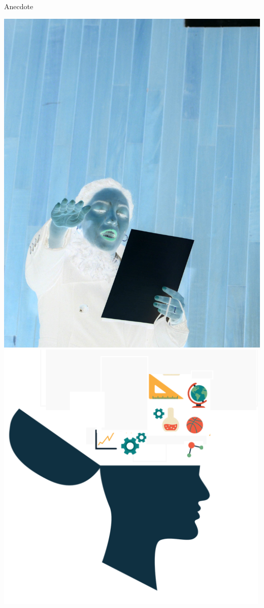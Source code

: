\documentclass{beamer}
\begin{document}
\begin{frame}
 {Anecdote}

\pause
\begin{center}
 \includegraphics[width=0.45\linewidth]{images/juramento_neg.png}
 \qquad \pause
 \includegraphics[width=0.45\linewidth]{images/open1.png}
\end{center}

\end{frame}
\end{document}
